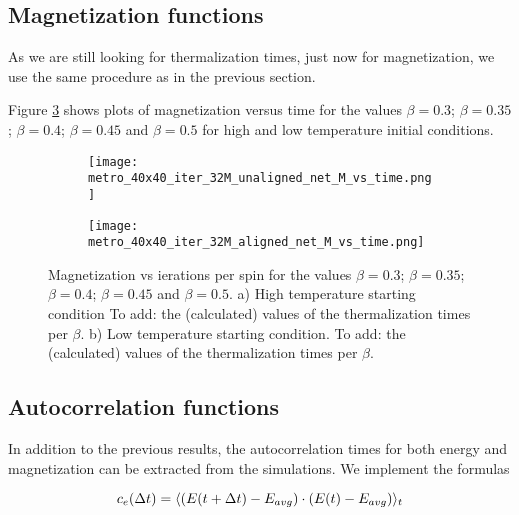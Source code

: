 \documentclass[11pt,a4paper]{article}
\DeclarePairedDelimiter{\avg}{\langle}{\rangle}
\begin{document}


\subsection{Magnetization functions}
As we are still looking for thermalization times, just now for magnetization, we use the same procedure as in
 the previous section. 

Figure \ref{fig:Mvt} shows plots of magnetization versus time for the values $\beta = 0.3$; $\beta = 0.35$;
 $\beta = 0.4$; $\beta = 0.45$ and $\beta = 0.5$ for high and low temperature initial conditions. 


\begin{figure}[h!]
\centering
\begin{subfigure}{.5\textwidth}
  \centering
  \texttt{[image: metro\_40x40\_iter\_32M\_unaligned\_net\_M\_vs\_time.png]}
  \caption{}
  \label{fig:Mvt_highT}
\end{subfigure}%
\begin{subfigure}{.5\textwidth}
  \centering
  \texttt{[image: metro\_40x40\_iter\_32M\_aligned\_net\_M\_vs\_time.png]}
  \caption{}
  \label{fig:Mvt_lowT}
\end{subfigure}
\caption{Magnetization vs ierations per spin for the values $\beta = 0.3$; $\beta = 0.35$;
         $\beta = 0.4$; $\beta = 0.45$ and $\beta = 0.5$. a) High temperature starting condition
         {\color{red}To add: the (calculated) values of the thermalization times per $\beta$}.
         b) Low temperature starting condition.
         {\color{red}To add: the (calculated) values of the thermalization times per $\beta$}.}
\label{fig:Mvt}
\end{figure}




\subsection{Autocorrelation functions}
In addition to the previous results, the autocorrelation times for both energy and magnetization can be
 extracted from the simulations. We implement the formulas

\begin{equation*}
    c_e(\Delta t) = \avg{(E(t+\Delta t) - E_{avg})\cdot (E(t)-E_{avg})}_t
\end{equation*}
\end{document}
